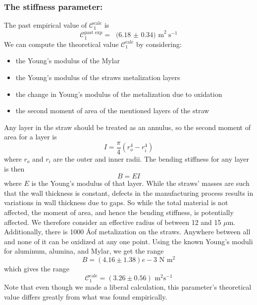\documentclass[twoside]{article}
\begin{document}
\begin{multicols}{2}
\subsubsection{The stiffness parameter:}
The past empirical value of $\mathcal{C}^\text{calc}_1$ is 
\begin{equation}
\mathcal{C}^\text{past exp}_1 = \text{ (6.18 $\pm$ 0.34)  m}^{2} \text{s}^{-1}
\end{equation} 
We can compute the theoretical value $\mathcal{C}^\text{calc}_1$ by considering:
\begin{itemize}
	\item the Young's modulus of the Mylar
	\item the Young's modulus of the straws metalization layers
	\item the change in Young's modulus of the metalization due to oxidation 
	\item the second moment of area of the mentioned layers of the straw 
\end{itemize}
Any layer in the straw should be treated as an annulus, so the second moment of area for a layer is
\begin{equation}
I = \frac{\pi}{4}(r^4_o - r^4_i)
\end{equation}
where $r_o$ and $r_i$ are the outer and inner radii.  The bending stiffness for any layer is then
\begin{equation}
B = E I
\end{equation}
where $E$ is the Young's modulus of that layer. While the straws' masses are such that the wall thickness is constant, defects in the manufacturing process results in variations in wall thickness due to gaps. So while the total material is not affected, the moment of area, and hence the bending stiffness, is potentially affected. We therefore consider an effective radius of between 12 and 15 $\mu$m. Additionally, there is 1000 \AA of metalization on the straws. Anywhere between all and none of it can be oxidized at any one point. Using the known Young's moduli for aluminum, alumina, and Mylar, we get the range
\begin{equation}
B = (4.16 \pm 1.38)e-3  \text{ N }  \text{m}^2
\end{equation}
which gives the range
\begin{equation}
\mathcal{C}^\text{calc}_1 = (3.26 \pm 0.56) \text{ m}^2 \text{s}^{-1}
\end{equation}
Note that even though we made a liberal calculation, this parameter's theoretical value differs greatly from what was found empirically.






\end{multicols}
\end{document}
